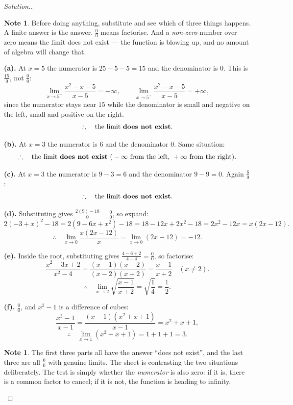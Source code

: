 \documentclass[11pt,a4paper]{article}
\theoremstyle{definition}
\newtheorem{note}[thm]{Note}
\newenvironment{solution}
  {\renewcommand{\qedsymbol}{}\begin{proof}[\textit{Solution}.]}
  {\end{proof}}
\begin{document}
\begin{solution}
\begin{note}
Before doing anything, substitute and see which of three things happens. A finite answer
is the answer. $\frac{0}{0}$ means factorise. And a \emph{non-zero} number over zero
means the limit does not exist --- the function is blowing up, and no amount of algebra
will change that.
\end{note}

\textbf{(a).} At $x=5$ the numerator is $25-5-5=15$ and the denominator is $0$. This is
$\frac{15}{0}$, not $\frac{0}{0}$:
$$\lim_{x\to 5^-}\frac{x^2-x-5}{x-5}=-\infty,\qquad
\lim_{x\to 5^+}\frac{x^2-x-5}{x-5}=+\infty,$$
since the numerator stays near $15$ while the denominator is small and negative on the
left, small and positive on the right.
$$\therefore\quad \text{the limit \textbf{does not exist}}.$$

\textbf{(b).} At $x=3$ the numerator is $6$ and the denominator $0$. Same situation:
$$\therefore\quad \text{the limit \textbf{does not exist}} \text{ (}-\infty
\text{ from the left, } +\infty \text{ from the right)}.$$

\textbf{(c).} At $x=3$ the numerator is $9-3=6$ and the denominator $9-9=0$. Again
$\frac{6}{0}$:
$$\therefore\quad \text{the limit \textbf{does not exist}}.$$

\textbf{(d).} Substituting gives $\frac{2(9)-18}{0}=\frac{0}{0}$, so expand:
$$2(-3+x)^2-18=2\left(9-6x+x^2\right)-18=18-12x+2x^2-18=2x^2-12x=x(2x-12).$$
$$\therefore\quad \lim_{x\to 0}\frac{x(2x-12)}{x}=\lim_{x\to 0}(2x-12)=-12.$$

\textbf{(e).} Inside the root, substituting gives $\frac{4-6+2}{4-4}=\frac{0}{0}$, so
factorise:
$$\frac{x^2-3x+2}{x^2-4}=\frac{(x-1)(x-2)}{(x-2)(x+2)}=\frac{x-1}{x+2}\quad (x\neq 2).$$
$$\therefore\quad \lim_{x\to 2}\sqrt{\frac{x-1}{x+2}}=\sqrt{\frac{1}{4}}=\frac{1}{2}.$$

\textbf{(f).} $\frac{0}{0}$, and $x^3-1$ is a difference of cubes:
$$\frac{x^3-1}{x-1}=\frac{(x-1)\left(x^2+x+1\right)}{x-1}=x^2+x+1,$$
$$\therefore\quad \lim_{x\to 1}\left(x^2+x+1\right)=1+1+1=3.$$

\begin{note}
The first three parts all have the answer ``does not exist'', and the last three are all
$\frac{0}{0}$ with genuine limits. The sheet is contrasting the two situations
deliberately. The test is simply whether the \emph{numerator} is also zero: if it is,
there is a common factor to cancel; if it is not, the function is heading to infinity.
\end{note}
\end{solution}
\end{document}
